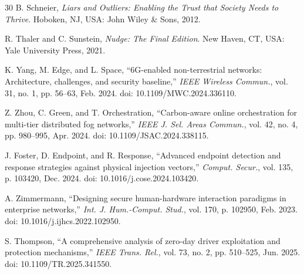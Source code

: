 \documentclass{ieeeaccess}
\begin{document}
\begin{thebibliography}{30}
B. Schneier, {\em Liars and Outliers: Enabling the Trust that Society Needs to Thrive}. Hoboken, NJ, USA: John Wiley \& Sons, 2012.

R. Thaler and C. Sunstein, {\em Nudge: The Final Edition}. New Haven, CT, USA: Yale University Press, 2021.

K. Yang, M. Edge, and L. Space, ``6G-enabled non-terrestrial networks: Architecture, challenges, and security baseline,'' {\em IEEE Wireless Commun.}, vol. 31, no. 1, pp. 56--63, Feb. 2024. doi: 10.1109/MWC.2024.336110.

Z. Zhou, C. Green, and T. Orchestration, ``Carbon-aware online orchestration for multi-tier distributed fog networks,'' {\em IEEE J. Sel. Areas Commun.}, vol. 42, no. 4, pp. 980--995, Apr. 2024. doi: 10.1109/JSAC.2024.338115.

J. Foster, D. Endpoint, and R. Response, ``Advanced endpoint detection and response strategies against physical injection vectors,'' {\em Comput. Secur.}, vol. 135, p. 103420, Dec. 2024. doi: 10.1016/j.cose.2024.103420.

A. Zimmermann, ``Designing secure human-hardware interaction paradigms in enterprise networks,'' {\em Int. J. Hum.-Comput. Stud.}, vol. 170, p. 102950, Feb. 2023. doi: 10.1016/j.ijhcs.2022.102950.

S. Thompson, ``A comprehensive analysis of zero-day driver exploitation and protection mechanisms,'' {\em IEEE Trans. Rel.}, vol. 73, no. 2, pp. 510--525, Jun. 2025. doi: 10.1109/TR.2025.341550.

\end{thebibliography}

\EOD
\end{document}
